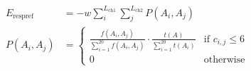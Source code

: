 \documentclass[paper=a5,fontsize=12pt]{scrbook}
\begin{document}
            \begin{preview}

            
            \begin{align}
            E_{\text{respref}} &= -w \sum_{i}^{L_{\text{ch1}}} \sum_{j}^{L_{\text{ch2}}} P(A_i, A_j) \\
            P(A_i, A_j) &=
            \begin{cases}
                \frac{f(A_i, A_j)}{\sum_{i=1}^{20} f(A_i, A_j)} \cdot \frac{t(A)}{\sum_{i=1}^{20} t(A_i)} & \text{if } c_{i,j} \leq 6 \\
                0 & \text{otherwise}
            \end{cases}
            \end{align}
            


            \end{preview}
            
\end{document}
